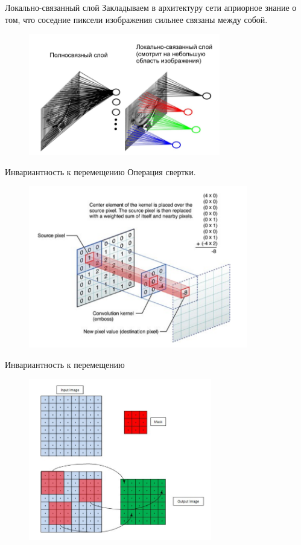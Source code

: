\documentclass[10pt]{beamer}
\begin{document}
\begin{frame}{Локально-связанный слой}
	Закладываем в архитектуру сети априорное знание о том, что
	соседние пиксели изображения сильнее связаны между собой.\\
	
	\begin{figure}[htbp]
	  \includegraphics[height=150pt, keepaspectratio = true]{images/local_layer}   
	\end{figure}
\end{frame}

\begin{frame}{Инвариантность к перемещению}
	Операция свертки.\\
	\begin{figure}[htbp]
	  \includegraphics[height=200pt, keepaspectratio = true]{images/conv}   
	\end{figure}
\end{frame}

\begin{frame}{Инвариантность к перемещению}
	\begin{figure}[htbp]
	  \includegraphics[height=200pt, keepaspectratio = true]{images/conv2}   
	\end{figure}
\end{frame}
\end{document}
